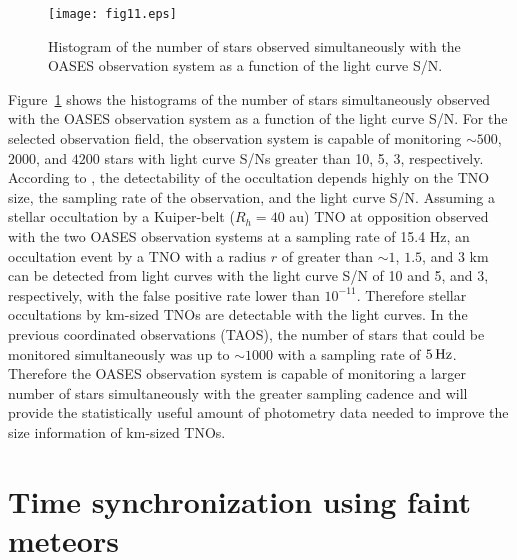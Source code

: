 \documentclass{pasj01}
\newcommand{\void}[1]{}
\renewcommand{\textcolor}{\void}
\begin{document}
\begin{figure}[!pt]
\begin{center}
   \texttt{[image: fig11.eps]}
   \caption{Histogram of the number of stars 
   observed simultaneously with the OASES observation system as a function of the light curve S/N.}
   \label{fig5}
 \end{center}
\end{figure}



Figure~\ref{fig5} shows the histograms of the number of stars simultaneously
observed with the OASES observation system as a function of the light curve S/N.
For the selected observation field, 
the observation system is capable of monitoring $\sim 500$, $2000$, and $4200$ stars 
with light curve S/Ns greater than 10, 5, 3, respectively.
According to \citet{nihei07},
the detectability of the occultation depends highly on the TNO size,
the sampling rate of the observation, and the light curve S/N. 
Assuming a stellar occultation by a Kuiper-belt ($R_h = 40$ au) TNO at opposition
observed with the two OASES observation systems at a sampling rate of 15.4 Hz,
an occultation event by a TNO with a 
\textcolor{red}{ radius $r$ of greater than $\sim 1$, $1.5$, and $3$ km}
can be detected from light curves with the light curve S/N of 10 and 5, and 3, 
respectively, with the false positive rate lower than $10^{-11}$.
Therefore stellar occultations by km-sized TNOs are detectable with the light curves.
%
In the previous coordinated observations (TAOS), 
the number of stars that could be monitored simultaneously 
was up to $\sim 1000$ \citep{lehner10} with a sampling rate of $5 \, {\rm Hz}$.
Therefore the OASES observation system is capable of monitoring 
a larger number of stars simultaneously with the greater sampling cadence
and will provide the statistically useful amount of photometry data 
needed to improve the size information of km-sized TNOs.


\section{Time synchronization using faint meteors}
\label{meteor}
\end{document}
